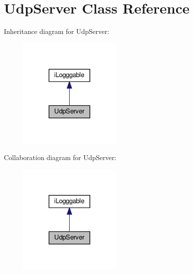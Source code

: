 \section{Udp\+Server Class Reference}
\label{class_udp_server}


Inheritance diagram for Udp\+Server\+:
\nopagebreak
\begin{figure}[H]
\begin{center}
\leavevmode
\includegraphics[width=143pt]{class_udp_server__inherit__graph}
\end{center}
\end{figure}


Collaboration diagram for Udp\+Server\+:
\nopagebreak
\begin{figure}[H]
\begin{center}
\leavevmode
\includegraphics[width=143pt]{class_udp_server__coll__graph}
\end{center}
\end{figure}
